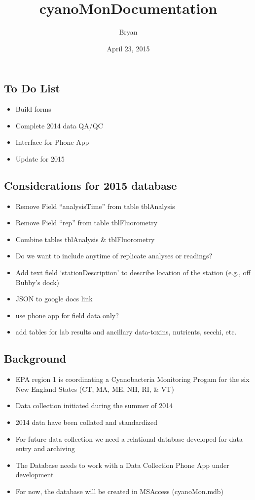 \documentclass[]{article}
\title{cyanoMonDocumentation}
\author{Bryan}
\date{April 23, 2015}
\begin{document}
\maketitle


\subsection{To Do List}\label{to-do-list}

\begin{itemize}
\itemsep1pt\parskip0pt
\item
  Build forms
\item
  Complete 2014 data QA/QC
\item
  Interface for Phone App
\item
  Update for 2015
\end{itemize}

\subsection{Considerations for 2015
database}\label{considerations-for-2015-database}

\begin{itemize}
\itemsep1pt\parskip0pt
\item
  Remove Field ``analysisTime'' from table tblAnalysis
\item
  Remove Field ``rep'' from table tblFluorometry
\item
  Combine tables tblAnalysis \& tblFluorometry
\item
  Do we want to include anytime of replicate analyses or readings?
\item
  Add text field `stationDescription' to describe location of the
  station (e.g., off Bubby's dock)
\item
  JSON to google docs link
\item
  use phone app for field data only?
\item
  add tables for lab results and ancillary data-toxins, nutrients,
  secchi, etc.
\end{itemize}

\subsection{Background}\label{background}

\begin{itemize}
\itemsep1pt\parskip0pt
\item
  EPA region 1 is coordinating a Cyanobacteria Monitoring Progam for the
  six New England States (CT, MA, ME, NH, RI, \& VT)
\item
  Data collection initiated during the summer of 2014
\item
  2014 data have been collated and standardized
\item
  For future data collection we need a relational database developed for
  data entry and archiving
\item
  The Database needs to work with a Data Collection Phone App under
  development
\item
  For now, the database will be created in MSAccess (cyanoMon.mdb)
\end{itemize}
\end{document}
